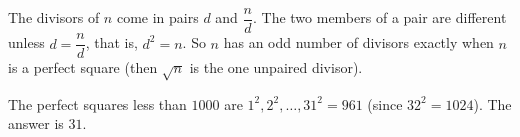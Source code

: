 The divisors of $n$ come in pairs $d$ and $\dfrac {n}{d}$. The two members of a pair are different unless $d=\dfrac {n}{d}$, that is, $d^2=n$. So $n$ has an odd number of divisors exactly when $n$ is a perfect square (then $\sqrt n$ is the one unpaired divisor).

The perfect squares less than $1000$ are $1^2,2^2,\dots,31^2=961$ (since $32^2=1024$). The answer is $\boxed{31}$.
